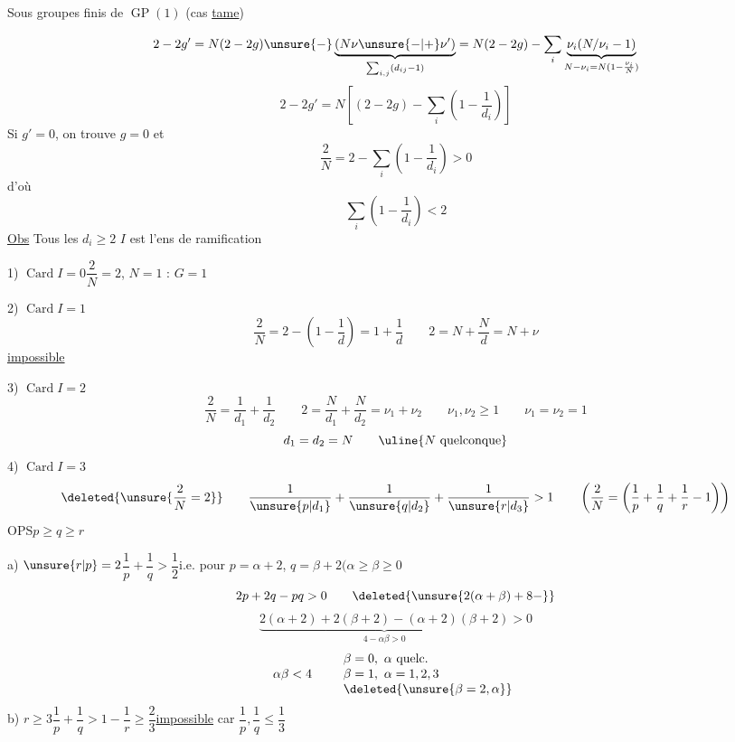 Sous groupes finis de $\operatorname{GP}(1)$ (cas \uline{tame})

\[
2-2g'=N(2-2g)\unsure{-}\underbrace{(N\nu\unsure{-|+}\nu')}_{\sum_{i,j}(d_{ij}-1)}
=N(2-2g)-\sum_i\underbrace{\nu_i(N/\nu_i-1)}_{N-\nu_i=N(1-\frac{\nu_i}{N})}
\]
\[
\boxed{2-2g'=N\left[(2-2g)-\sum_i\left(1-\frac1{d_i}\right)\right]}
\]
Si $g'=0$, on trouve $g=0$ et
\[
\boxed{\frac2N=2-\sum_i\left(1-\frac1{d_i}\right)>0}
\]
d'où
\[
\sum_i\left(1-\frac1{d_i}\right)<2
\]
\uline{Obs} Tous les $d_i\geq2$   $I$ est \uline{} l'ens de ramification

1) $\operatorname{Card}I=0$\qquad $\dfrac2N=2$, $N=1$ :  $G=1$

2) $\operatorname{Card}I=1$
\[
\frac2N=2-\left(1-\frac1d\right)=1+\frac1d\qquad
2=N+\frac Nd=N+\nu
\]
\uline{impossible}

3) $\operatorname{Card}I=2$
\[
\frac2N=\frac1{d_1}+\frac1{d_2}\qquad
2=\frac N{d_1}+\frac N{d_2}=\nu_1+\nu_2\qquad
\nu_1,\nu_2\geq1\qquad\nu_1=\nu_2=1
\]
\[
d_1=d_2=N\qquad\uline{N\text{ quelconque}}
\]
4) $\operatorname{Card}I=3$
\[
\deleted{\unsure{\frac2N=2}}\qquad
\frac1{\unsure{p|d_1}}+\frac1{\unsure{q|d_2}}+\frac1{\unsure{r|d_3}}>1
\qquad\left(\frac2N=\left(\frac1p+\frac1q+\frac1r-1\right)\right)
\]
OPS\qquad $p\geq q\geq r$

a) $\unsure{r|p}=2$\qquad $\dfrac1p+\dfrac1q>\dfrac12$\qquad i.e. pour $p=\alpha+2$, $q=\beta+2$\quad $(\alpha\geq\beta\geq0$
\margin{$\unsure{\alpha}$}
\[
2p+2q-pq>0\qquad\deleted{\unsure{2(\alpha+\beta)+8-}}
\]
\[
\underbrace{2(\alpha+2)+2(\beta+2)-(\alpha+2)(\beta+2)}_{4-\alpha\beta>0}>0
\]
\[
\alpha\beta<4\qquad
\begin{array}{l}
\beta=0,\ \alpha\text{ quelc.}\\
\beta=1,\ \alpha=1,2,3\\
\deleted{\unsure{\beta=2,\alpha}}
\end{array}
\]
b) $r\geq3$\qquad $\dfrac1p+\dfrac1q>1-\dfrac1r\geq\dfrac23$\quad\uline{impossible} car $\dfrac1p,\dfrac1q\leq\dfrac13$

